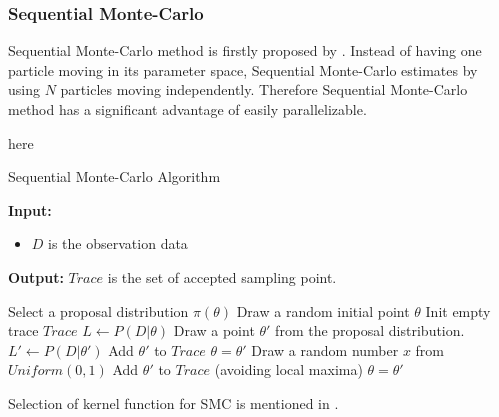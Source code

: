 \subsubsection{Sequential Monte-Carlo}
Sequential Monte-Carlo method is firstly proposed by \cite{del2006sequential}.  Instead of having
one particle moving in its parameter space, Sequential Monte-Carlo estimates by using $N$ particles
moving independently. Therefore Sequential Monte-Carlo method has a significant advantage of easily
parallelizable.

here \cite{daviet2018inference}
\begin{algorithm}[H]
    \caption{Sequential Monte-Carlo Algorithm}
    \label{smc-algorithm}
    \hspace*{\algorithmicindent} \textbf{Input:}
    \begin{itemize}
        \item $D$ is the observation data
    \end{itemize}
    \hspace*{\algorithmicindent} \textbf{Output:} $Trace$ is the set of accepted
    sampling point.
    \begin{algorithmic}[1]
        \State Select a proposal distribution $\pi(\theta)$
        \State Draw a random initial point $\theta$
        \State Init empty trace $Trace$
        \State $L \leftarrow P(D|\theta)$
        \State Draw a point $\theta' $ from the proposal distribution.
        \State $L' \leftarrow P(D|\theta')$
        \State Add $\theta'$ to $Trace$
        \State $\theta = \theta'$
        \Else
        \State Draw a random number $x$ from $Uniform(0,1)$
        \State Add $\theta'$ to $Trace$ (avoiding local maxima)
        \State $\theta = \theta'$
        \EndIf
        \EndIf
        \EndWhile
        \EndProcedure
    \end{algorithmic}
\end{algorithm}
Selection of kernel function for SMC is mentioned in \cite{silk2012optimizing}.

